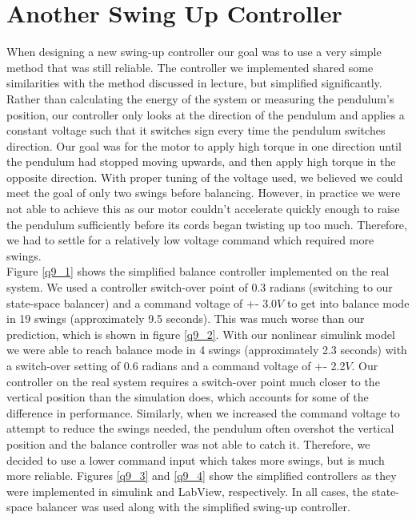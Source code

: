 \documentclass{article}
\theoremstyle{plain}
\theoremstyle{definition}
\theoremstyle{remark}
\begin{document}
\clearpage
\section{Another Swing Up Controller}
When designing a new swing-up controller our goal was to use a very simple method that was still reliable. The controller we implemented shared some similarities with the method discussed in lecture, but simplified significantly. Rather than calculating the energy of the system or measuring the pendulum's position, our controller only looks at the direction of the pendulum and applies a constant voltage such that it switches sign every time the pendulum switches direction. Our goal was for the motor to apply high torque in one direction until the pendulum had stopped moving upwards, and then apply high torque in the opposite direction. With proper tuning of the voltage used, we believed we could meet the goal of only two swings before balancing. However, in practice we were not able to achieve this as our motor couldn't accelerate quickly enough to raise the pendulum sufficiently before its cords began twisting up too much. Therefore, we had to settle for a relatively low voltage command which required more swings. \\

Figure \ref{q9_1} shows the simplified balance controller implemented on the real system. We used a controller switch-over point of 0.3 radians (switching to our state-space balancer) and a command voltage of +- 3.0$V$ to get into balance mode in 19 swings (approximately 9.5 seconds). This was much worse than our prediction, which is shown in figure \ref{q9_2}. With our nonlinear simulink model we were able to reach balance mode in 4 swings (approximately 2.3 seconds) with a switch-over setting of 0.6 radians and a command voltage of +- 2.2$V$. Our controller on the real system requires a switch-over point much closer to the vertical position than the simulation does, which accounts for some of the difference in performance. Similarly, when we increased the command voltage to attempt to reduce the swings needed, the pendulum often overshot the vertical position and the balance controller was not able to catch it. Therefore, we decided to use a lower command input which takes more swings, but is much more reliable. Figures \ref{q9_3} and \ref{q9_4} show the simplified controllers as they were implemented in simulink and LabView, respectively. In all cases, the state-space balancer was used along with the simplified swing-up controller.\\
\end{document}
